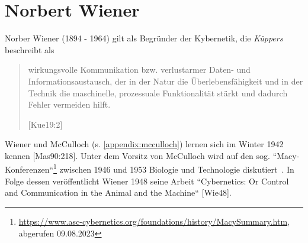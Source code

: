 \section{Norbert Wiener}\label{appendix:wiener}

Norber Wiener (1894 - 1964) gilt als Begründer der Kybernetik, die \textit{Küppers} beschreibt als

\blockquote[{[Kue19:2]}]{
    wirkungsvolle Kommunikation bzw. verlustarmer Daten- und Informationsaustausch, der in der Natur die Überlebensfähigkeit und in der Technik die maschinelle, prozessuale Funktionalität stärkt und dadurch Fehler vermeiden hilft.
}

Wiener und McCulloch (s. \ref{appendix:mcculloch}) lernen sich im Winter 1942 kennen [Mas90:218].
Unter dem Vorsitz von McCulloch wird auf den sog. ``Macy-Konferenzen``\footnote{
    \url{https://www.asc-cybernetics.org/foundations/history/MacySummary.htm}, abgerufen 09.08.2023
} zwischen 1946 und 1953 Biologie und Technologie diskutiert~\cite[5]{Arb19}.
In Folge dessen veröffentlicht Wiener 1948 seine Arbeit ``Cybernetics: Or Control and Communication in the Animal and the Machine`` [Wie48].